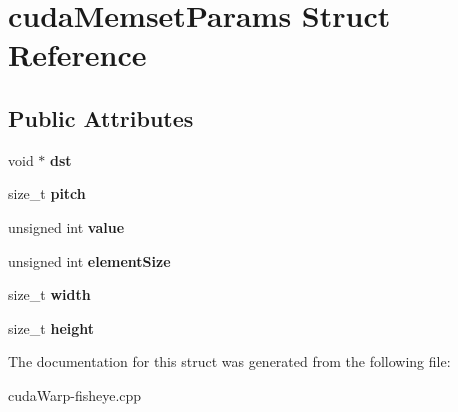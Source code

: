 \hypertarget{structcudaMemsetParams}{}\section{cuda\+Memset\+Params Struct Reference}
\label{structcudaMemsetParams}
\subsection*{Public Attributes}
\begin{DoxyCompactItemize}
\item 
void $\ast$ {\bfseries dst}\hypertarget{structcudaMemsetParams_a2296cc35e61e331a6ac6050f91f854f0}{}\label{structcudaMemsetParams_a2296cc35e61e331a6ac6050f91f854f0}

\item 
size\+\_\+t {\bfseries pitch}\hypertarget{structcudaMemsetParams_a08cf13f3fc01d877a61370610c60af75}{}\label{structcudaMemsetParams_a08cf13f3fc01d877a61370610c60af75}

\item 
unsigned int {\bfseries value}\hypertarget{structcudaMemsetParams_a483d1c0ac70b3c006fc4c9db27781721}{}\label{structcudaMemsetParams_a483d1c0ac70b3c006fc4c9db27781721}

\item 
unsigned int {\bfseries element\+Size}\hypertarget{structcudaMemsetParams_a462a43108c55ddb710b2128dfe4798ec}{}\label{structcudaMemsetParams_a462a43108c55ddb710b2128dfe4798ec}

\item 
size\+\_\+t {\bfseries width}\hypertarget{structcudaMemsetParams_a5f3c75c5ea5af51a534ba174adbe8ef1}{}\label{structcudaMemsetParams_a5f3c75c5ea5af51a534ba174adbe8ef1}

\item 
size\+\_\+t {\bfseries height}\hypertarget{structcudaMemsetParams_a0dfe23ad7cb2ec66d57de1fe06cfcc5e}{}\label{structcudaMemsetParams_a0dfe23ad7cb2ec66d57de1fe06cfcc5e}

\end{DoxyCompactItemize}


The documentation for this struct was generated from the following file\+:\begin{DoxyCompactItemize}
\item 
cuda\+Warp-\/fisheye.\+cpp\end{DoxyCompactItemize}

